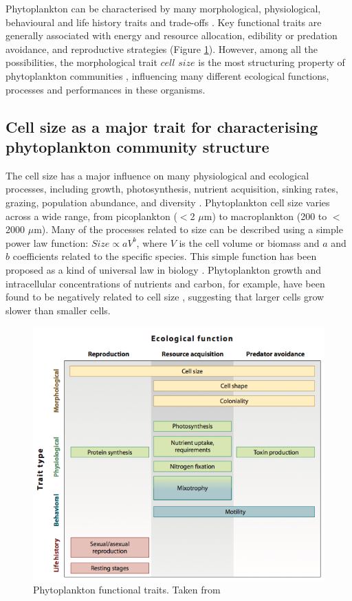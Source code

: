 Phytoplankton can be characterised by many morphological, physiological, behavioural and life history traits and trade-offs \citep{Litchman2008, Litchman2010}. Key functional traits are generally associated with energy and resource allocation, edibility or predation avoidance, and reproductive strategies (Figure \ref{phytotrait}). However, among all the possibilities, the morphological trait $cell$ $size$ is the  most structuring property of phytoplankton communities \citep{Litchman2008, Finkel2009a, Litchman2010}, influencing many different ecological functions, processes and performances in these organisms. 

\subsection{Cell size as a major trait for characterising phytoplankton community structure}
The cell size has a major influence on many physiological and ecological processes, including growth, photosynthesis, nutrient acquisition, sinking rates, grazing, population abundance, and diversity \citep{Finkel2009a}. Phytoplankton cell size varies across a wide range, from picoplankton ($<$2 $\mu$m) to macroplankton (200 to $<$2000 $\mu$m). Many of the processes related to size can be described using a simple power law function: $Size \propto aV^ b$, where $V$ is the cell volume or biomass and $a$ and $b$ coefficients related to the specific species. This simple function has been proposed as a kind of universal law in biology \citep{Platt1981}. Phytoplankton growth and intracellular concentrations of nutrients and carbon, for example, have been found to be negatively related to cell size \citep{Tang1995}, suggesting that larger cells grow slower than smaller cells. 

\begin{figure}
\centering
\includegraphics[width=0.7\linewidth]{./Chp1-Intro/Fig_litchman2008.png}
\caption[Scheme]{\small{Phytoplankton functional traits. Taken from \citet{Litchman2008}}}
\label{phytotrait}
\end{figure}

